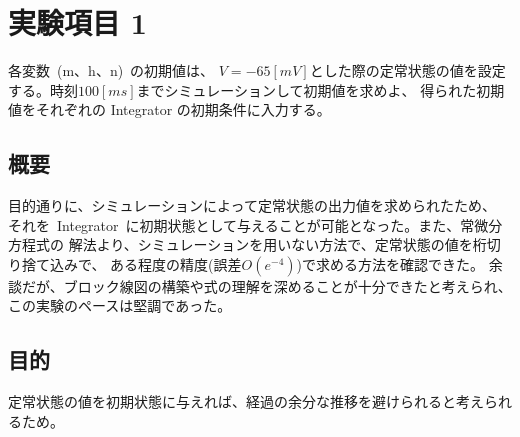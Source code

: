 \documentclass[10pt]{jarticle}
\title{\framebox{\hspace{4zw}シミュレーション レポート4%
                 \hspace{4zw}}}
\author{神野 友哉 \\
        2022311042  \\
        愛知県立大学 情報科学部 情報科学科 \\}
\date{2024年5月15日}
\begin{document}
\maketitle
\tableofcontents


\section{実験項目 1 }
各変数\ (m、h、n)\ の初期値は、 $ V = -65[mV] $とした際の定常状態の値を設定する。時刻$ 100[ms] $までシミュレーションして初期値を求めよ、
得られた初期値をそれぞれの Integrator の初期条件に入力する。

\subsection{概要}
%
目的通りに、シミュレーションによって定常状態の出力値を求められたため、
それを\ Integrator\ に初期状態として与えることが可能となった。また、常微分方程式の
解法より、シミュレーションを用いない方法で、定常状態の値を桁切り捨て込みで、
ある程度の精度($ 誤差 O(e^{-4}) $)で求める方法を確認できた。
余談だが、ブロック線図の構築や式の理解を深めることが十分できたと考えられ、この実験のペースは堅調であった。
%

\subsection{目的}
%
定常状態の値を初期状態に与えれば、経過の余分な推移を避けられると考えられるため。
%
\end{document}
